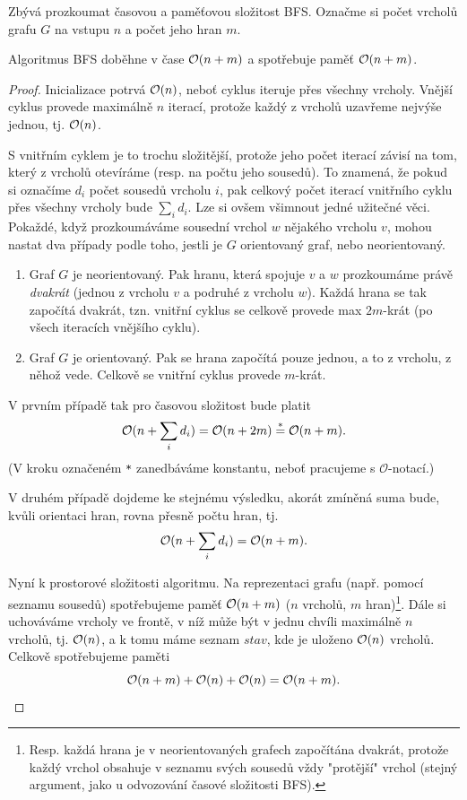 Zbývá prozkoumat časovou a paměťovou složitost BFS. Označme si počet vrcholů grafu $G$ na vstupu $n$ a počet jeho hran $m$. 
\begin{theorem}\label{thm:bfs_slozitost}
    Algoritmus BFS doběhne v čase $\mathcal{O}(n+m)$ a spotřebuje paměť $\mathcal{O}(n+m)$.
\end{theorem}
\begin{proof}
    Inicializace potrvá $\mathcal{O}(n)$, neboť cyklus iteruje přes všechny vrcholy. Vnější cyklus provede maximálně $n$ iterací, protože každý z vrcholů uzavřeme nejvýše jednou, tj. $\mathcal{O}(n)$.

    S vnitřním cyklem je to trochu složitější, protože jeho počet iterací závisí na tom, který z vrcholů otevíráme (resp. na počtu jeho sousedů). To znamená, že pokud si označíme $d_i$ počet sousedů vrcholu $i$, pak celkový počet iterací vnitřního cyklu přes všechny vrcholy bude $\sum_i{d_i}$. Lze si ovšem všimnout jedné užitečné věci. Pokaždé, když prozkoumáváme sousední vrchol $w$ nějakého vrcholu $v$, mohou nastat dva případy podle toho, jestli je $G$ orientovaný graf, nebo neorientovaný.
    \begin{enumerate}[label=(\roman*)]
        \item\label{bfs_slozitost_neor_graf} Graf $G$ je neorientovaný. Pak hranu, která spojuje $v$ a $w$ prozkoumáme právě \emph{dvakrát} (jednou z vrcholu $v$ a podruhé z vrcholu $w$). Každá hrana se tak započítá dvakrát, tzn. vnitřní cyklus se celkově provede max $2m$-krát (po všech iteracích vnějšího cyklu).
        \item\label{bfs_slozitost_or_graf} Graf $G$ je orientovaný. Pak se hrana započítá pouze jednou, a to z vrcholu, z něhož vede. Celkově se vnitřní cyklus provede $m$-krát.
    \end{enumerate}
    V prvním případě tak pro časovou složitost bude platit
    \[\mathcal{O}(n+\sum_i{d_i})=\mathcal{O}(n+2m)\stackrel{*}{=}\mathcal{O}(n+m).\]
    (V kroku označeném \texttt{*} zanedbáváme konstantu, neboť pracujeme s $\mathcal{O}$-notací.)\par
    V druhém případě dojdeme ke stejnému výsledku, akorát zmíněná suma bude, kvůli orientaci hran, rovna přesně počtu hran, tj.
    \[\mathcal{O}(n+\sum_i{d_i})=\mathcal{O}(n+m).\]

    Nyní k prostorové složitosti algoritmu. Na reprezentaci grafu (např. pomocí seznamu sousedů) spotřebujeme paměť $\mathcal{O}(n+m)$ ($n$ vrcholů, $m$ hran)\footnote{Resp. každá hrana je v neorientovaných grafech započítána dvakrát, protože každý vrchol obsahuje v seznamu svých sousedů vždy "protější" vrchol (stejný argument, jako u odvozování časové složitosti BFS).}. Dále si uchováváme vrcholy ve frontě, v níž může být v jednu chvíli maximálně $n$ vrcholů, tj. $\mathcal{O}(n)$, a k tomu máme seznam $stav$, kde je uloženo $\mathcal{O}(n)$ vrcholů. Celkově spotřebujeme paměti
    \[\mathcal{O}(n+m)+\mathcal{O}(n)+\mathcal{O}(n)=\mathcal{O}(n+m).\]
\end{proof}
